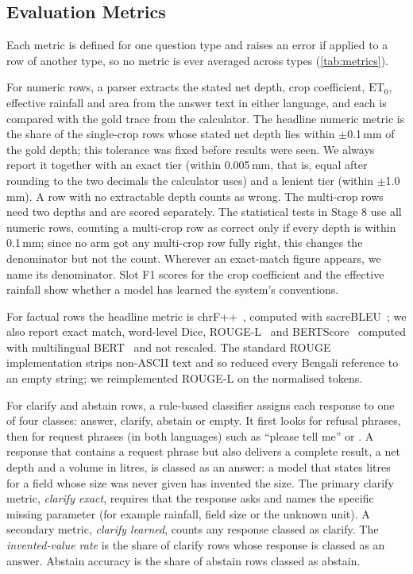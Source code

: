 \subsection{Evaluation Metrics}
\label{sec:impl-metrics}

Each metric is defined for one question type and raises an error if applied to a row of another type, so no metric is ever averaged across types (\cref{tab:metrics}).

 For numeric rows, a parser extracts the stated net depth, crop coefficient, $\mathrm{ET}_0$, effective rainfall and area from the answer text in either language, and each is compared with the gold trace from the calculator. The headline numeric metric is the share of the \NumericSingle single-crop rows whose stated net depth lies within $\pm$0.1\,mm of the gold depth; this tolerance was fixed before results were seen. We always report it together with an exact tier (within 0.005\,mm, that is, equal after rounding to the two decimals the calculator uses) and a lenient tier (within $\pm$1.0\,mm). A row with no extractable depth counts as wrong. The \NumericMulti multi-crop rows need two depths and are scored separately. The statistical tests in Stage 8 use all \NumericAll numeric rows, counting a multi-crop row as correct only if every depth is within 0.1\,mm; since no arm got any multi-crop row fully right, this changes the denominator but not the count. Wherever an exact-match figure appears, we name its denominator. Slot F1 scores for the crop coefficient and the effective rainfall show whether a model has learned the system's conventions.

For factual rows the headline metric is chrF++~\cite{popovic2015chrf,popovic2017chrfpp}, computed with sacreBLEU~\cite{post2018call}; we also report exact match, word-level Dice, ROUGE-L~\cite{lin2004rouge} and BERTScore~\cite{zhang2020bertscore} computed with multilingual BERT~\cite{devlin2019bert} and not rescaled. The standard ROUGE implementation strips non-ASCII text and so reduced every Bengali reference to an empty string; we reimplemented ROUGE-L on the normalised tokens.

For clarify and abstain rows, a rule-based classifier assigns each response to one of four classes: answer, clarify, abstain or empty. It first looks for refusal phrases, then for request phrases (in both languages) such as ``please tell me'' or . A response that contains a request phrase but also delivers a complete result, a net depth and a volume in litres, is classed as an answer: a model that states litres for a field whose size was never given has invented the size. The primary clarify metric, \emph{clarify exact}, requires that the response asks and names the specific missing parameter (for example rainfall, field size or the unknown unit). A secondary metric, \emph{clarify learned}, counts any response classed as clarify. The \emph{invented-value rate} is the share of clarify rows whose response is classed as an answer. Abstain accuracy is the share of abstain rows classed as abstain.

